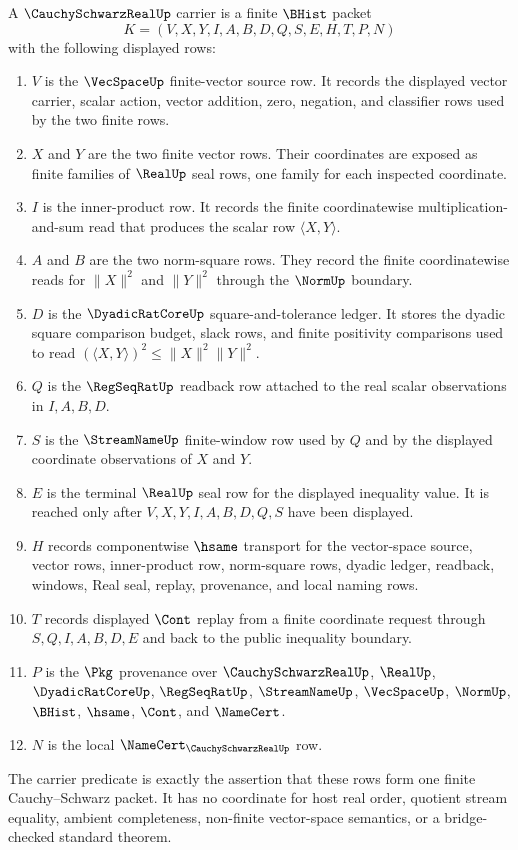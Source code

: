 \begin{definition}
\label{def:cauchy-schwarz-real-carrier}
A $\CauchySchwarzRealUp$ carrier is a finite $\BHist$ packet
$$
K=(V,X,Y,I,A,B,D,Q,S,E,H,T,P,N)
$$
with the following displayed rows:
\begin{enumerate}
\item $V$ is the $\VecSpaceUp$ finite-vector source row. It records the displayed vector carrier, scalar action, vector addition, zero, negation, and classifier rows used by the two finite rows.
\item $X$ and $Y$ are the two finite vector rows. Their coordinates are exposed as finite families of $\RealUp$ seal rows, one family for each inspected coordinate.
\item $I$ is the inner-product row. It records the finite coordinatewise multiplication-and-sum read that produces the scalar row $\langle X,Y\rangle$.
\item $A$ and $B$ are the two norm-square rows. They record the finite coordinatewise reads for $\|X\|^2$ and $\|Y\|^2$ through the $\NormUp$ boundary.
\item $D$ is the $\DyadicRatCoreUp$ square-and-tolerance ledger. It stores the dyadic square comparison budget, slack rows, and finite positivity comparisons used to read $(\langle X,Y\rangle)^2\leq \|X\|^2\|Y\|^2$.
\item $Q$ is the $\RegSeqRatUp$ readback row attached to the real scalar observations in $I,A,B,D$.
\item $S$ is the $\StreamNameUp$ finite-window row used by $Q$ and by the displayed coordinate observations of $X$ and $Y$.
\item $E$ is the terminal $\RealUp$ seal row for the displayed inequality value. It is reached only after $V,X,Y,I,A,B,D,Q,S$ have been displayed.
\item $H$ records componentwise $\hsame$ transport for the vector-space source, vector rows, inner-product row, norm-square rows, dyadic ledger, readback, windows, Real seal, replay, provenance, and local naming rows.
\item $T$ records displayed $\Cont$ replay from a finite coordinate request through $S,Q,I,A,B,D,E$ and back to the public inequality boundary.
\item $P$ is the $\Pkg$ provenance over $\CauchySchwarzRealUp$, $\RealUp$, $\DyadicRatCoreUp$, $\RegSeqRatUp$, $\StreamNameUp$, $\VecSpaceUp$, $\NormUp$, $\BHist$, $\hsame$, $\Cont$, and $\NameCert$.
\item $N$ is the local $\NameCert_{\CauchySchwarzRealUp}$ row.
\end{enumerate}
The carrier predicate is exactly the assertion that these rows form one finite Cauchy--Schwarz packet. It has no coordinate for host real order, quotient stream equality, ambient completeness, non-finite vector-space semantics, or a bridge-checked standard theorem.
\end{definition}

